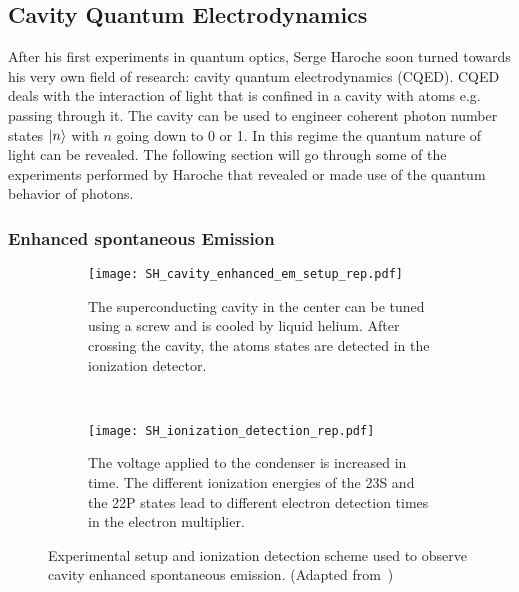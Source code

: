 \subsection{Cavity Quantum Electrodynamics}
\label{sec:CQED}
After his first experiments in quantum optics, Serge Haroche soon turned towards
his very own field of research: cavity quantum electrodynamics (CQED). CQED
deals with the interaction of light that is confined in a cavity with atoms
e.g. passing through it. The cavity can be used to engineer coherent photon number
states $\ket{n}$ with $n$ going down to 0 or 1. In this regime the quantum
nature of light can be revealed. The following section will go through some of
the experiments performed by Haroche that revealed or made use of the quantum
behavior of photons. 

\subsubsection{Enhanced spontaneous Emission}
\label{sec:EnhancedSpontEm}

\begin{figure}[t]
  \centering
  \begin{subfigure}[t]{0.48\linewidth}
    \centering
    \texttt{[image: SH\_cavity\_enhanced\_em\_setup\_rep.pdf]}
    \caption{The superconducting cavity in the center can be tuned using a screw
    and is cooled by liquid helium. After crossing the cavity, the atoms states
  are detected in the ionization detector.}
    \label{fig:cavity_enhanced_setup}
  \end{subfigure}
  ~
  \begin{subfigure}[t]{0.48\linewidth}
    \centering
    \texttt{[image: SH\_ionization\_detection\_rep.pdf]}
    \caption{The voltage applied to the condenser is increased in time. The
    different ionization energies of the 23S and the 22P states lead to
  different electron detection times in the electron multiplier.}
    \label{fig:ionization_detection}
  \end{subfigure}
  \caption{Experimental setup and ionization detection scheme used to observe
  cavity enhanced spontaneous emission. (Adapted
from~\cite{haroche1983EnhancedSpontEm})}
  \label{}
\end{figure}

